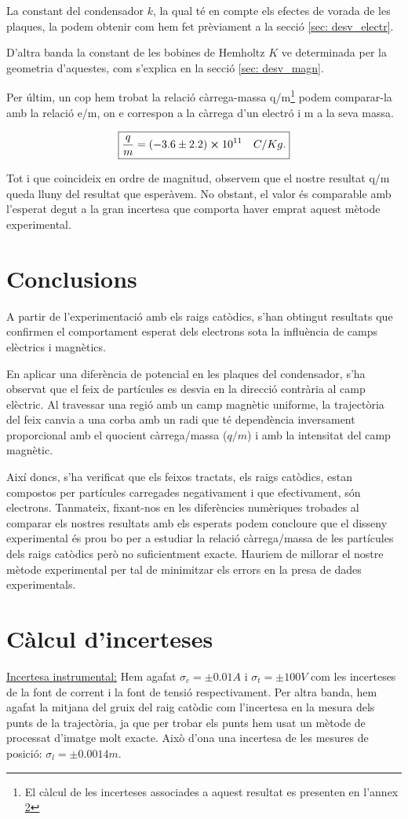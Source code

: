 \documentclass[11pt]{article}
\begin{document}
La constant del condensador $k$, la qual té en compte els efectes de vorada de les plaques, la podem obtenir com hem fet prèviament a la secció \ref{sec: desv_electr}. 

D'altra banda la constant de les bobines de Hemholtz $K$ ve determinada per la geometria d'aquestes, com s'explica en la secció \ref{sec: desv_magn}.

Per últim, un cop hem trobat la relació càrrega-massa q/m\footnote{El càlcul de les incerteses associades a aquest resultat es presenten en l'annex \ref{sec: incerteses}} podem comparar-la amb la relació e/m, on e correspon a la càrrega d'un electró i m a la seva massa.

\[
\boxed{\frac{q}{m}=(-3.6\pm2.2)\cross10^{11}\quad C/Kg.}
\] 

Tot i que coincideix en ordre de magnitud, observem que el nostre resultat q/m queda lluny del resultat que esperàvem. No obstant, el valor és comparable amb l'esperat degut a la gran incertesa que comporta haver emprat aquest mètode experimental. 

\section{Conclusions}
A partir de l'experimentació amb els raigs catòdics, s'han obtingut resultats que confirmen el comportament esperat dels electrons sota la influència de camps elèctrics i magnètics. 
    
En aplicar una diferència de potencial en les plaques del condensador, s'ha observat que el feix de partícules es desvia en la direcció contrària al camp elèctric. Al travessar una regió amb un camp magnètic uniforme, la trajectòria del feix canvia a una corba amb un radi que té dependència inversament proporcional amb el quocient càrrega/massa ($q/m$) i amb la intensitat del camp magnètic. 

Així doncs, s'ha verificat que els feixos tractats, els raigs catòdics, estan compostos per partícules carregades negativament i que efectivament, són electrons. Tanmateix, fixant-nos en les diferències numèriques trobades al comparar els nostres resultats amb els esperats podem concloure que el disseny experimental és prou bo per a estudiar la relació càrrega/massa de les partícules dels raigs catòdics però no suficientment exacte. Hauriem de millorar el nostre mètode experimental per tal de minimitzar els errors en la presa de dades experimentals.
\newpage
{}

\section{Càlcul d'incerteses}\label{sec: incerteses}
\underline{Incertesa instrumental:} Hem agafat $\sigma_{c}=\pm0.01A$ i $\sigma_{t}=\pm100V$ com les incerteses de la font de corrent i la font de tensió respectivament. Per altra banda, hem agafat la mitjana del gruix del raig catòdic com  l'incertesa en la mesura dels punts de la trajectòria, ja que per trobar els punts hem usat un mètode de processat d'imatge molt exacte. Això d'ona una incertesa de les mesures de posició: $\sigma_{l}=\pm0.0014m$.
\end{document}
